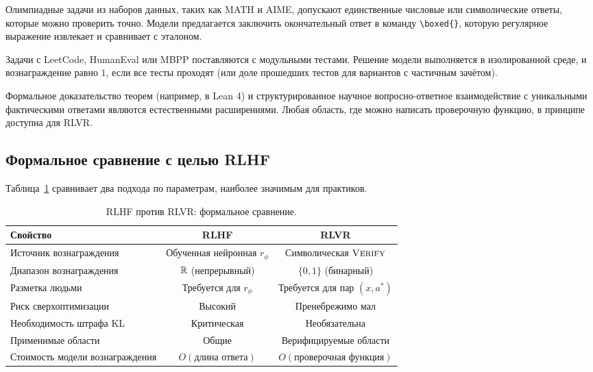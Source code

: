 \begin{description}[leftmargin=!,labelwidth=3.5cm]
\item[Математика] Олимпиадные задачи из наборов данных, таких как
  MATH и AIME, допускают единственные числовые или символические ответы, которые можно
  проверить точно. Модели предлагается заключить окончательный
  ответ в команду \texttt{\textbackslash boxed\{\}}, которую регулярное
  выражение извлекает и сравнивает с эталоном.

\item[Генерация кода] Задачи с LeetCode, HumanEval или MBPP
  поставляются с модульными тестами. Решение модели выполняется в изолированной среде,
  и вознаграждение равно $1$, если все тесты проходят (или доле прошедших тестов
  для вариантов с частичным зачётом).

\item[Наука и логика] Формальное доказательство теорем (например, в Lean 4) и
  структурированное научное вопросно-ответное взаимодействие с уникальными фактическими ответами
  являются естественными расширениями. Любая область, где можно написать проверочную функцию,
  в принципе доступна для RLVR.
\end{description}

\subsection{Формальное сравнение с целью RLHF}
\label{subsec:rlvr-vs-rlhf}

Таблица~\ref{tab:rlhf-vs-rlvr} сравнивает два подхода по
параметрам, наиболее значимым для практиков.

\begin{table}[ht]
\centering
\small
\caption{RLHF против RLVR: формальное сравнение.}
\label{tab:rlhf-vs-rlvr}
\begin{tabular}{@{}lcc@{}}
\toprule
\textbf{Свойство} & \textbf{RLHF} & \textbf{RLVR} \\
\midrule
Источник вознаграждения & Обученная нейронная $r_\phi$ & Символическая $\textsc{Verify}$ \\
Диапазон вознаграждения & $\mathbb{R}$ (непрерывный) & $\{0, 1\}$ (бинарный) \\
Разметка людьми & Требуется для $r_\phi$ & Требуется для пар $(x, a^*)$ \\
Риск сверхоптимизации & Высокий & Пренебрежимо мал \\
Необходимость штрафа KL & Критическая & Необязательна \\
Применимые области & Общие & Верифицируемые области \\
Стоимость модели вознаграждения & $O(\text{длина ответа})$ & $O(\text{проверочная функция})$ \\
\bottomrule
\end{tabular}
\end{table}

